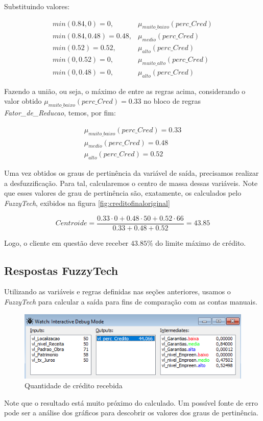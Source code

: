 \documentclass[12pt]{article}
\begin{document}
Substituindo valores:

\begin{align*}
	min(0.84,0)=0,&\mu_{muito\_baixo}(perc\_Cred)\\
	min(0.84,0.48)=0.48,&\mu_{medio}(perc\_Cred)\\
	min(0.52)=0.52,&\mu_{alto}(perc\_Cred)\\
	min(0,0.52)=0,&\mu_{muito\_alto}(perc\_Cred)\\
	min(0,0.48)=0,&\mu_{alto}(perc\_Cred)
\end{align*}

Fazendo a união, ou seja, o máximo de entre as regras acima, considerando o valor obtido $\mu_{muito\_baixo}(perc\_Cred)=0.33$ no bloco de regras \textit{Fator\_de\_Reducao}, temos, por fim:

\begin{align*}
	\mu_{muito\_baixo}(perc\_Cred)=0.33\\
	\mu_{medio}(perc\_Cred)=0.48\\
	\mu_{alto}(perc\_Cred)=0.52
\end{align*}

Uma vez obtidos os graus de pertinência da variável de saída, precisamos realizar a desfuzzificação. Para tal, calcularemos o centro de massa dessas variáveis. Note que esses valores de grau de pertinência são, exatamente, os calculados pelo \textit{FuzzyTech}, exibidos na figura \ref{fig:creditofinaloriginal}

\begin{equation*}
	Centroide=\dfrac{0.33\cdot0+0.48\cdot50+0.52\cdot66}{0.33+0.48+0.52}=43.85
\end{equation*}

Logo, o cliente em questão deve receber $43.85\%$ do limite máximo de crédito.
	
\subsection{Respostas FuzzyTech}

Utilizando as variáveis e regras definidas nas seções anteriores, usamos o \textit{FuzzyTech} para calcular a saída para fins de comparação com as contas manuais.

\begin{figure}[H]
	\centering
	\includegraphics[width=0.8\linewidth]{Imagens/financiamento/ResultadoFinalOriginal}
	\caption{Quantidade de crédito recebida}
	\label{fig:resultadofinaloriginal}
\end{figure}

Note que o resultado está muito próximo do calculado. Um possível fonte de erro pode ser a análise dos gráficos para descobrir os valores dos graus de pertinência.
\end{document}
